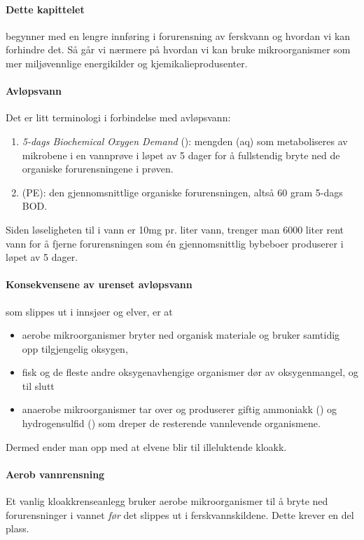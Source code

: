 
\paragraph{Dette kapittelet} begynner med en lengre innføring i forurensning av ferskvann og hvordan vi kan forhindre det. Så går vi nærmere på hvordan vi kan bruke mikroorganismer som mer miljøvennlige energikilder og kjemikalieprodusenter.

\paragraph{Avløpsvann} Det er litt terminologi i forbindelse med avløpsvann:
\begin{enumerate}
	\item \emph{5-dags Biochemical Oxygen Demand} (): mengden  (aq) som metaboliseres av mikrobene i en vannprøve i løpet av 5 dager for å fullstendig bryte ned de organiske forurensningene i prøven.
	\item {} (PE): den gjennomsnittlige organiske forurensningen, altså 60 gram 5-dags BOD.
\end{enumerate}
Siden løseligheten til  i vann er 10mg  pr. liter vann, trenger man 6000 liter rent vann for å fjerne forurensningen som én gjennomsnittlig bybeboer produserer i løpet av 5 dager. 

\paragraph{Konsekvensene av urenset avløpsvann} som slippes ut i innsjøer og elver, er at 
\begin{itemize}[nolistsep,noitemsep]
	\item aerobe mikroorganismer bryter ned organisk materiale og bruker samtidig opp tilgjengelig oksygen,
	\item fisk og de fleste andre oksygenavhengige organismer dør av oksygenmangel, og til slutt
	\item anaerobe mikroorganismer tar over og produserer giftig ammoniakk () og hydrogensulfid () som dreper de resterende vannlevende organismene.
\end{itemize}
Dermed ender man opp med at elvene blir til illeluktende kloakk.

\paragraph{Aerob vannrensning} Et vanlig kloakkrenseanlegg bruker aerobe mikroorganismer til å bryte ned forurensninger i vannet \emph{før} det slippes ut i ferskvannskildene. Dette krever en del plass.


